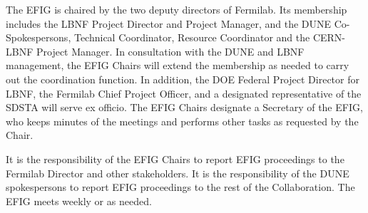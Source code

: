 The EFIG is chaired by the two deputy directors of Fermilab.
Its membership includes the LBNF Project Director and Project Manager, and 
the DUNE Co-Spokespersons, Technical Coordinator, Resource Coordinator and the CERN-LBNF Project Manager.
In consultation with the DUNE and LBNF management, the EFIG Chairs will
extend the membership as needed 
to carry out the coordination
function. In addition, the DOE Federal Project Director for LBNF,
the Fermilab Chief Project Officer, and a designated representative
of the SDSTA will
serve ex officio. The EFIG Chairs designate a Secretary of the EFIG,
who keeps minutes of the meetings and performs other tasks as
requested by the Chair.

It is the responsibility of the EFIG Chairs to report EFIG proceedings
to the Fermilab Director and other stakeholders. It is the responsibility
of the DUNE spokespersons to report EFIG proceedings to the rest of
the Collaboration. The EFIG meets weekly or as needed.

